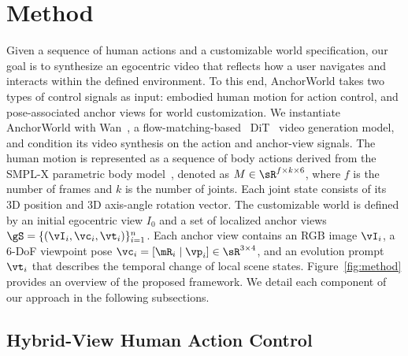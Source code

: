 \section{Method}\label{sec:3}

Given a sequence of human actions and a customizable world specification, our goal is to synthesize an egocentric video that reflects how a user navigates and interacts within the defined environment. 
To this end, AnchorWorld takes two types of control signals as input: embodied human motion for action control, and pose-associated anchor views for world customization.
We instantiate AnchorWorld with Wan~\cite{wan2025wan}, a flow-matching-based~\cite{lipman2022flow} DiT~\citep{peebles2023scalable} video generation model, and condition its video synthesis on the action and anchor-view signals.
The human motion is represented as a sequence of body actions derived from the SMPL-X parametric body model~\cite{pavlakos2019expressive}, denoted as
$M \in \sR^{f \times k \times 6}$, where $f$ is the number of frames and $k$ is the number of joints. 
Each joint state consists of its 3D position and 3D axis-angle rotation vector. 
The customizable world is defined by an initial egocentric view $I_0$ and a set of localized anchor views $\gS = \{ (\vI_i, \vc_i, \vt_i) \}_{i=1}^n$. 
Each anchor view contains an RGB image $\vI_i$, a 6-DoF viewpoint pose $\vc_i = [\mR_i \mid \vp_i] \in \sR^{3 \times 4}$, and an evolution prompt $\vt_i$ that describes the temporal change of local scene states.
Figure~\ref{fig:method} provides an overview of the proposed framework. 
We detail each component of our approach in the following subsections.





\subsection{Hybrid-View Human Action Control}\label{sec:3.1}

